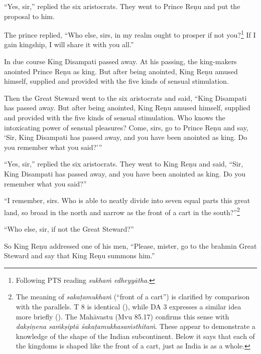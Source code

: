 \documentclass[12pt,openany]{book}%
\newcommand*{\langlzh}[1]{\cjk{#1}\normalfont}%
\begin{document}
“Yes, sir,” replied the six aristocrats. They went to Prince \textsanskrit{Reṇu} and put the proposal to him. 

The prince replied, “Who else, sirs, in my realm ought to prosper if not you?\footnote{Following PTS reading \textit{\textsanskrit{sukhaṁ} \textsanskrit{edheyyātha}}. } If I gain kingship, I will share it with you all.” 

In due course King Disampati passed away. At his passing, the king-makers anointed Prince \textsanskrit{Reṇu} as king. But after being anointed, King \textsanskrit{Reṇu} amused himself, supplied and provided with the five kinds of sensual stimulation. 

Then the Great Steward went to the six aristocrats and said, “King Disampati has passed away. But after being anointed, King \textsanskrit{Reṇu} amused himself, supplied and provided with the five kinds of sensual stimulation. Who knows the intoxicating power of sensual pleasures? Come, sirs, go to Prince \textsanskrit{Reṇu} and say, ‘Sir, King Disampati has passed away, and you have been anointed as king. Do you remember what you said?’” 

“Yes, sir,” replied the six aristocrats. They went to King \textsanskrit{Reṇu} and said, “Sir, King Disampati has passed away, and you have been anointed as king. Do you remember what you said?” 

“I remember, sirs. Who is able to neatly divide into seven equal parts this great land, so broad in the north and narrow as the front of a cart in the south?”\footnote{The meaning of \textit{\textsanskrit{sakaṭamukhaṁ}} (“front of a cart”) is clarified by comparison with the parallels. T 8 is identical (\langlzh{其界廣闊。正南南隅，其界狹略，猶如車形}), while DA 3 expresses a similar idea more briefly (\langlzh{此閻浮提地， 內廣外狹}). The \textsanskrit{Mahāvastu} (Mvu 85.17) confirms this sense with \textit{\textsanskrit{dakṣiṇena} \textsanskrit{saṁkṣiptā} \textsanskrit{śakaṭamukhasaṁsthitaṁ}}. These appear to demonstrate a knowledge of the shape of the Indian subcontinent. Below it says that each of the kingdoms is shaped like the front of a cart, just as India is as a whole. } 

“Who else, sir, if not the Great Steward?” 

So King \textsanskrit{Reṇu} addressed one of his men, “Please, mister, go to the brahmin Great Steward and say that King \textsanskrit{Reṇu} summons him.” 
\end{document}
